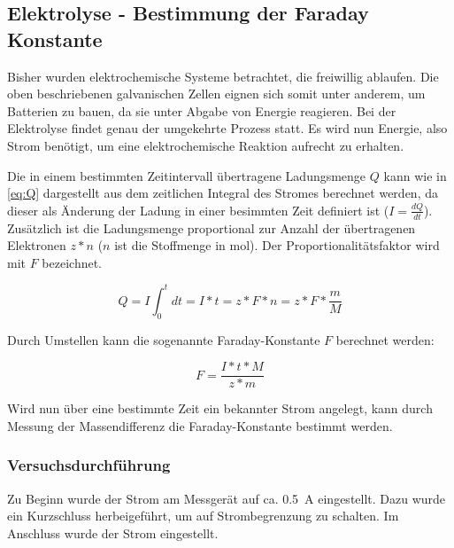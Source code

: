 \documentclass{article}
\begin{document}
    \pagebreak
    
    \subsection{Elektrolyse - Bestimmung der Faraday Konstante}
    
      Bisher wurden elektrochemische Systeme betrachtet, die freiwillig ablaufen. Die oben beschriebenen galvanischen Zellen eignen sich somit unter anderem, um Batterien zu bauen, da sie unter Abgabe von Energie reagieren. Bei der Elektrolyse findet genau der umgekehrte Prozess statt. Es wird nun Energie, also Strom benötigt, um eine elektrochemische Reaktion aufrecht zu erhalten. 
      
      Die in einem bestimmten Zeitintervall übertragene Ladungsmenge $Q$ kann wie in \eqref{eq:Q} dargestellt aus dem zeitlichen Integral des Stromes berechnet werden, da dieser als Änderung der Ladung in einer besimmten Zeit definiert ist ($I=\frac{dQ}{dt}$). Zusätzlich ist die Ladungsmenge proportional zur Anzahl der übertragenen Elektronen $z * n$ ($n$ ist die Stoffmenge in mol). Der Proportionalitätsfaktor wird mit $F$ bezeichnet.
      
      \begin{equation}
        Q = I \int_{0}^{t} dt = I * t = z * F * n = z * F * \frac{m}{M} \label{eq:Q}
      \end{equation}
      
      Durch Umstellen kann die sogenannte Faraday-Konstante $F$ berechnet werden:
      
      \begin{equation}
        F = \frac{I * t * M}{z * m} \label{eq:Faraday}
      \end{equation}
      
      Wird nun über eine bestimmte Zeit ein bekannter Strom angelegt, kann durch Messung der Massendifferenz die Faraday-Konstante bestimmt werden.
      
      \subsubsection{Versuchsdurchführung}
      
        Zu Beginn wurde der Strom am Messgerät auf ca. \SI[mode=text]{0.5}{\ampere} eingestellt. Dazu wurde ein Kurzschluss herbeigeführt, um auf Strombegrenzung zu schalten. Im Anschluss wurde der Strom eingestellt. 
        
\end{document}
